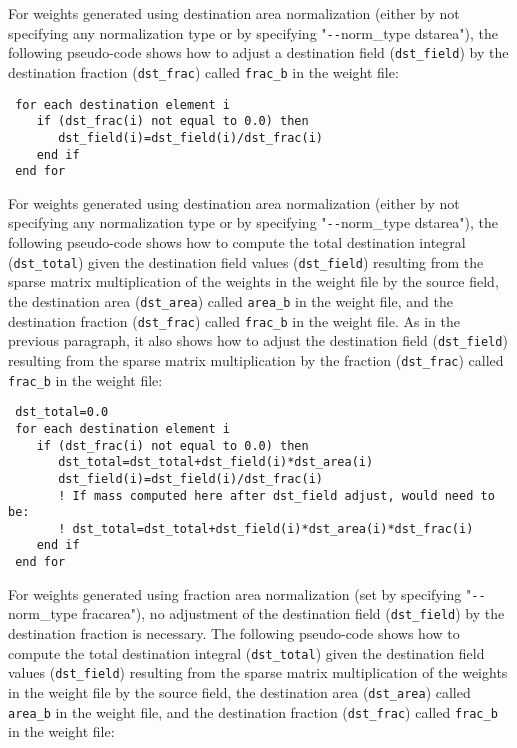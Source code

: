 For weights generated using destination area normalization (either by not specifying any normalization type or by specifying "\verb+--+norm\_type dstarea"), 
the following pseudo-code shows how to adjust a destination field ({\tt dst\_field}) by the destination fraction ({\tt dst\_frac}) called {\tt frac\_b} in the weight file:

\begin{verbatim}
 for each destination element i
    if (dst_frac(i) not equal to 0.0) then
       dst_field(i)=dst_field(i)/dst_frac(i)
    end if
 end for
\end{verbatim}

For weights generated using destination area normalization (either by not specifying any normalization type or by specifying "\verb+--+norm\_type dstarea"), 
the following pseudo-code shows how to compute the total destination integral ({\tt dst\_total}) given the destination field values ({\tt dst\_field}) resulting
from the sparse matrix multiplication of the weights in the weight file by the source field, the destination area ({\tt dst\_area}) called {\tt area\_b} in the
weight file, and the destination fraction ({\tt dst\_frac}) called {\tt frac\_b} in the weight file. As in the previous paragraph, it also
shows how to adjust the destination field ({\tt dst\_field}) resulting from the sparse matrix multiplication by the fraction
({\tt dst\_frac}) called {\tt frac\_b} in the weight file:

\begin{verbatim}
 dst_total=0.0
 for each destination element i
    if (dst_frac(i) not equal to 0.0) then
       dst_total=dst_total+dst_field(i)*dst_area(i)
       dst_field(i)=dst_field(i)/dst_frac(i)
       ! If mass computed here after dst_field adjust, would need to be:
       ! dst_total=dst_total+dst_field(i)*dst_area(i)*dst_frac(i)
    end if
 end for
\end{verbatim}

For weights generated using fraction area normalization (set by specifying "\verb+--+norm\_type fracarea"), no adjustment of the destination field ({\tt dst\_field}) by the destination fraction is necessary. The following pseudo-code shows how to compute the total destination integral ({\tt dst\_total}) given the destination field values ({\tt dst\_field}) resulting
 from the sparse matrix multiplication of the weights in the weight file by the source field, the destination area ({\tt dst\_area}) called {\tt area\_b} in the
weight file, and the destination fraction ({\tt dst\_frac}) called {\tt frac\_b} in the weight file: 

